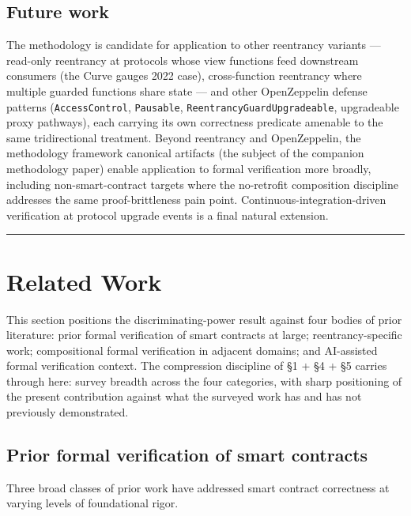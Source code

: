 \subsection{Future work}\label{future-work}

The methodology is candidate for application to other reentrancy
variants --- read-only reentrancy at protocols whose view functions feed
downstream consumers (the Curve gauges 2022 case), cross-function
reentrancy where multiple guarded functions share state --- and other
OpenZeppelin defense patterns (\texttt{AccessControl},
\texttt{Pausable}, \texttt{ReentrancyGuardUpgradeable}, upgradeable
proxy pathways), each carrying its own correctness predicate amenable to
the same tridirectional treatment. Beyond reentrancy and OpenZeppelin,
the methodology framework canonical artifacts (the subject of the
companion methodology paper) enable application to formal verification
more broadly, including non-smart-contract targets where the no-retrofit
composition discipline addresses the same proof-brittleness pain point.
Continuous-integration-driven verification at protocol upgrade events is
a final natural extension.

\begin{center}\rule{0.5\linewidth}{0.5pt}\end{center}

\section{Related Work}\label{related-work}

This section positions the discriminating-power result against four
bodies of prior literature: prior formal verification of smart contracts
at large; reentrancy-specific work; compositional formal verification in
adjacent domains; and AI-assisted formal verification context. The
compression discipline of §1 + §4 + §5 carries through here: survey
breadth across the four categories, with sharp positioning of the
present contribution against what the surveyed work has and has not
previously demonstrated.

\subsection{Prior formal verification of smart
contracts}\label{prior-formal-verification-of-smart-contracts}

Three broad classes of prior work have addressed smart contract
correctness at varying levels of foundational rigor.

